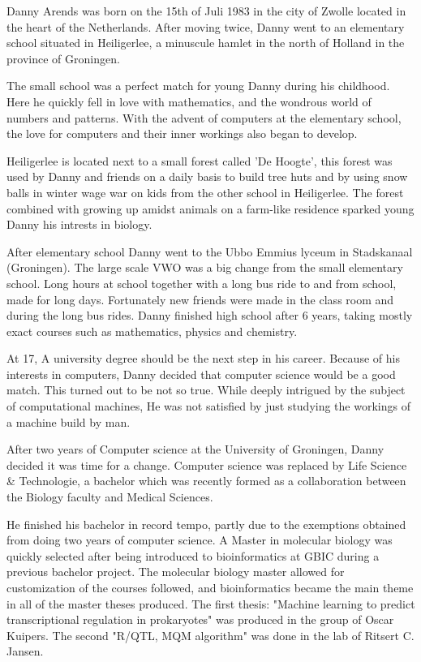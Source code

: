 Danny Arends was born on the 15th of Juli 1983 in the city of Zwolle located in the heart 
of the Netherlands. After moving twice, Danny went to an elementary school situated in 
Heiligerlee, a minuscule hamlet in the north of Holland in the province of Groningen. 

The small school was a perfect match for young Danny during his childhood. Here he quickly 
fell in love with mathematics, and the wondrous world of numbers and patterns. With the 
advent of computers at the elementary school, the love for computers and their inner 
workings also began to develop.

Heiligerlee is located next to a small forest called 'De Hoogte', this forest was used 
by Danny and friends on a daily basis to build tree huts and by using snow balls in winter 
wage war on kids from the other school in Heiligerlee. The forest combined with growing up 
amidst animals on a farm-like residence sparked young Danny his intrests in biology.

After elementary school Danny went to the Ubbo Emmius lyceum in Stadskanaal (Groningen). 
The large scale VWO was a big change from the small elementary school. Long hours at school 
together with a long bus ride to and from school, made for long days. Fortunately new 
friends were made in the class room and during the long bus rides. Danny finished high 
school after 6 years, taking mostly exact courses such as mathematics, physics and chemistry.

At 17, A university degree should be the next step in his career. Because of his interests 
in computers, Danny decided that computer science would be a good match. This turned out 
to be not so true. While deeply intrigued by the subject of computational machines, He 
was not satisfied by just studying the workings of a machine build by man.

After two years of Computer science at the University of Groningen, Danny decided it was time 
for a change. Computer science was replaced by Life Science \& Technologie, a bachelor which 
was recently formed as a collaboration between the Biology faculty and Medical Sciences.

He finished his bachelor in record tempo, partly due to the exemptions obtained from 
doing two years of computer science. A Master in molecular biology was quickly selected after
being introduced to bioinformatics at GBIC during a previous bachelor project. The molecular 
biology master allowed for customization of the courses followed, and bioinformatics became the main 
theme in all of the master theses produced. The first thesis: "Machine learning to predict 
transcriptional regulation in prokaryotes" was produced in the group of Oscar Kuipers. 
The second "R/QTL, MQM algorithm" was done in the lab of Ritsert C. Jansen.

